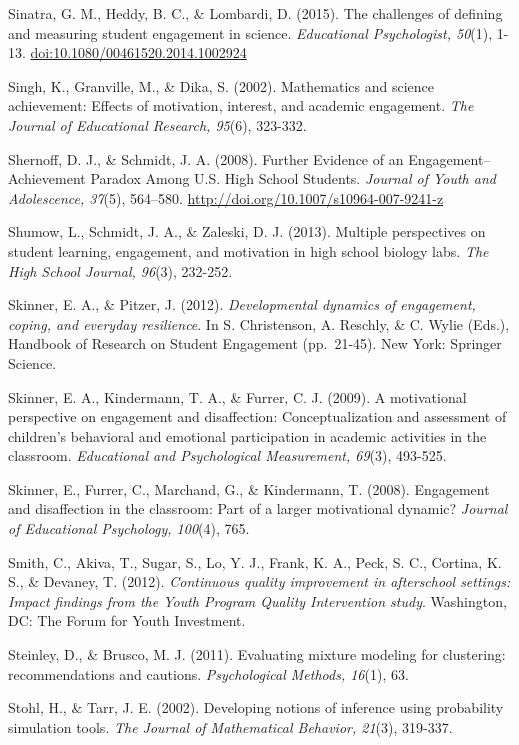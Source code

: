 \documentclass[]{msu-thesis}
\theoremstyle{definition}
\theoremstyle{definition}
\theoremstyle{definition}
\theoremstyle{remark}
\begin{document}
Sinatra, G. M., Heddy, B. C., \& Lombardi, D. (2015). The challenges of
defining and measuring student engagement in science. \emph{Educational
Psychologist, 50}(1), 1-13. \url{doi:10.1080/00461520.2014.1002924}

Singh, K., Granville, M., \& Dika, S. (2002). Mathematics and science
achievement: Effects of motivation, interest, and academic engagement.
\emph{The Journal of Educational Research, 95}(6), 323-332.

Shernoff, D. J., \& Schmidt, J. A. (2008). Further Evidence of an
Engagement--Achievement Paradox Among U.S. High School Students.
\emph{Journal of Youth and Adolescence, 37}(5), 564--580.
\url{http://doi.org/10.1007/s10964-007-9241-z}

Shumow, L., Schmidt, J. A., \& Zaleski, D. J. (2013). Multiple
perspectives on student learning, engagement, and motivation in high
school biology labs. \emph{The High School Journal, 96}(3), 232-252.

Skinner, E. A., \& Pitzer, J. (2012). \emph{Developmental dynamics of
engagement, coping, and everyday resilience}. In S. Christenson, A.
Reschly, \& C. Wylie (Eds.), Handbook of Research on Student Engagement
(pp.~21-45). New York: Springer Science.

Skinner, E. A., Kindermann, T. A., \& Furrer, C. J. (2009). A
motivational perspective on engagement and disaffection:
Conceptualization and assessment of children's behavioral and emotional
participation in academic activities in the classroom. \emph{Educational
and Psychological Measurement, 69}(3), 493-525.

Skinner, E., Furrer, C., Marchand, G., \& Kindermann, T. (2008).
Engagement and disaffection in the classroom: Part of a larger
motivational dynamic? \emph{Journal of Educational Psychology, 100}(4),
765.

Smith, C., Akiva, T., Sugar, S., Lo, Y. J., Frank, K. A., Peck, S. C.,
Cortina, K. S., \& Devaney, T. (2012). \emph{Continuous quality
improvement in afterschool settings: Impact findings from the Youth
Program Quality Intervention study}. Washington, DC: The Forum for Youth
Investment.

Steinley, D., \& Brusco, M. J. (2011). Evaluating mixture modeling for
clustering: recommendations and cautions. \emph{Psychological Methods,
16}(1), 63.

Stohl, H., \& Tarr, J. E. (2002). Developing notions of inference using
probability simulation tools. \emph{The Journal of Mathematical
Behavior, 21}(3), 319-337.
\end{document}
